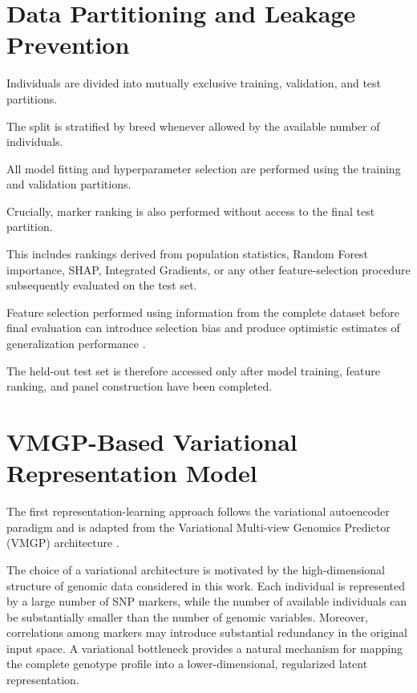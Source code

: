 \section{Data Partitioning and Leakage Prevention}
\label{sec:data_partitioning}

Individuals are divided into mutually exclusive training,
validation, and test partitions.


The split is stratified by breed whenever allowed by the available
number of individuals.

All model fitting and hyperparameter selection are performed using
the training and validation partitions.

Crucially, marker ranking is also performed without access to the
final test partition.

This includes rankings derived from population statistics,
Random Forest importance, SHAP, Integrated Gradients, or any other
feature-selection procedure subsequently evaluated on the test set.

Feature selection performed using information from the complete
dataset before final evaluation can introduce selection bias and
produce optimistic estimates of generalization performance
\cite{ambroise2002selection}.

The held-out test set is therefore accessed only after model
training, feature ranking, and panel construction have been
completed.


\section{VMGP-Based Variational Representation Model}
\label{sec:vmgp_architecture}

The first representation-learning approach follows the variational
autoencoder paradigm \cite{kingma2013auto,rezende2014stochastic} and
is adapted from the Variational Multi-view Genomics Predictor (VMGP)
architecture \cite{zhao2025vmgp}.

The choice of a variational architecture is motivated by the
high-dimensional structure of genomic data considered in this work.
Each individual is represented by a large number of SNP markers,
while the number of available individuals can be substantially
smaller than the number of genomic variables. Moreover, correlations
among markers may introduce substantial redundancy in the original
input space. A variational bottleneck provides a natural mechanism
for mapping the complete genotype profile into a lower-dimensional,
regularized latent representation.

